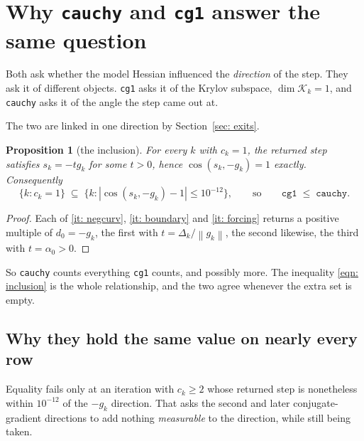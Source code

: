 \documentclass[11pt,a4paper]{article}
\providecommand{\calK}{{\mathcal{K}}}
\providecommand{\abs}[1]{\left \vert #1 \right \vert}
\providecommand{\norm}[1]{\left \lVert #1 \right \rVert}
\newtheorem{proposition}{Proposition}
\theoremstyle{remark}
\begin{document}
\section{Why \texttt{cauchy} and \texttt{cg1} answer the same question}
\label{sec: same question}

Both ask whether the model Hessian influenced the \emph{direction} of the step.
They ask it of different objects. \texttt{cg1} asks it of the Krylov subspace,
$\dim\calK_k = 1$, and \texttt{cauchy} asks it of the angle the step came out at.

The two are linked in one direction by Section~\ref{sec: exits}.

\begin{proposition}[the inclusion]\label{prop: inclusion}
  For every $k$ with $c_k = 1$, the returned step satisfies $s_k = -t g_k$ for
  some $t > 0$, hence $\cos(s_k,-g_k) = 1$ exactly. Consequently
  \begin{equation}
    \{k : c_k = 1\} \;\subseteq\;
    \bigl\{k : \abs{\cos(s_k,-g_k) - 1} \leq 10^{-12}\bigr\},
    \qquad\text{so}\qquad
    \texttt{cg1} \;\leq\; \texttt{cauchy}.
    \label{eqn: inclusion}
  \end{equation}
\end{proposition}

\begin{proof}
  Each of \ref{it: negcurv}, \ref{it: boundary} and \ref{it: forcing} returns a
  positive multiple of $d_0 = -g_k$, the first with $t = \Delta_k/\norm{g_k}$,
  the second likewise, the third with $t = \alpha_0 > 0$.
\end{proof}

So \texttt{cauchy} counts everything \texttt{cg1} counts, and possibly more. The
inequality \eqref{eqn: inclusion} is the whole relationship, and the two agree
whenever the extra set is empty.

\subsection{Why they hold the same value on nearly every row}

Equality fails only at an iteration with $c_k \geq 2$ whose returned step is
nonetheless within $10^{-12}$ of the $-g_k$ direction. That asks the second and
later conjugate-gradient directions to add nothing \emph{measurable} to the
direction, while still being taken.
\end{document}
